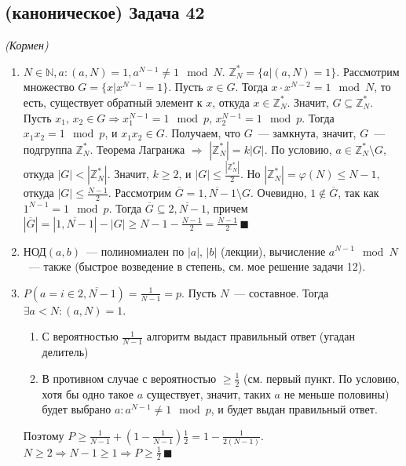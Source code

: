 \documentclass[a4paper]{article}
\newcommand{\ZZ}{\mathbb{Z}}
\newcommand{\NN}{\mathbb{N}}
\begin{document}
\begin{enumerate}
\subsection*{(каноническое) Задача 42}
{\em (Кормен)}
\begin{enumerate}
\item $N\in\NN,a\colon (a,N)=1, a^{N-1}\neq 1\mod N$. $\ZZ_N^*=\{a\big|(a,N)=1\}$. Рассмотрим множество $G=\{x\big|x^{N-1}=1\}$. Пусть $x\in G$. Тогда $x\cdot x^{N-2}=1\mod N$, то есть, существует обратный элемент к $x$, откуда $x\in \ZZ_N^*$. Значит, $G\subseteq \ZZ_N^*$. Пусть $x_1,\,x_2\in G\Rightarrow x_1^{N-1}=1\mod p$, $x_2^{N-1}=1\mod p$. Тогда $x_1x_2=1\mod p$, и $x_1x_2\in G$. Получаем, что $G$~--- замкнута, значит, $G$~--- подгруппа $\ZZ_N^*$. Теорема Лагранжа $\Rightarrow$ $|\ZZ_N^*|=k|G|$. По условию, $a\in\ZZ_N^*\setminus G$, откуда $|G|<|\ZZ_N^*|$. Значит, $k\geqslant 2$, и $|G|\leqslant \frac{|\ZZ_N^*|}{2}$. Но $|\ZZ_N^*|=\varphi(N)\leqslant N-1$, откуда $|G|\leqslant\frac{N-1}{2}$. Рассмотрим $\overline{G}=\overline{1,N-1}\setminus G$. Очевидно, $1\notin \overline{G}$, так как $1^{N-1}=1\mod p$. Тогда $\overline{G}\subseteq\overline{2,N-1}$, причем $|\overline{G}|=|\overline{1,N-1}|-|G|\geqslant N-1-\frac{N-1}{2}=\frac{N-1}{2}\,\blacksquare$
\item $\mbox{НОД}(a,b)$~--- полиномиален по $|a|,\,|b|$ (лекции), вычисление $a^{N-1}\mod N$~--- также (быстрое возведение в степень, см. мое решение задачи 12).
\item $P(a=i\in\overline{2,N-1})=\frac{1}{N-1}=p$. Пусть $N$~--- составное. Тогда $\exists a<N\colon (a,N)=1$.\begin{enumerate}
\item С вероятностью $\frac{1}{N-1}$ алгоритм выдаст правильный ответ (угадан делитель)
\item В противном случае с вероятностью $\geqslant \frac{1}{2}$ (см. первый пункт. По условию, хотя бы одно такое $a$ существует, значит, таких $a$ не меньше половины) будет выбрано $a\colon a^{N-1}\neq 1\mod p$, и будет выдан правильный ответ.
\end{enumerate}
Поэтому $P\geqslant \frac{1}{N-1}+(1-\frac{1}{N-1})\frac{1}{2}=1-\frac{1}{2(N-1)}$. $N\geqslant 2\Rightarrow N-1\geqslant 1\Rightarrow P\geqslant\frac{1}{2}\,\blacksquare$
\end{enumerate}
\end{enumerate}
\end{document}
